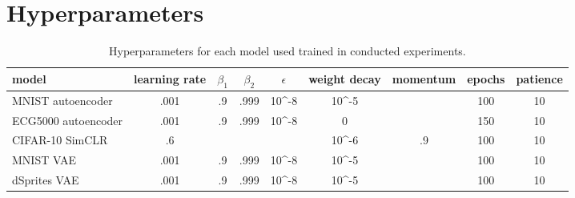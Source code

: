 \section{Hyperparameters}
\label{sec:apphyper}
\begin{table}[h]
	\vskip -0.1in
 	\caption{Hyperparameters for each model used trained in conducted experiments.}
	\vspace{-0.1in}
	\label{tab:hyperparams}
	\vskip 0.05in
	\begin{center}
		\begin{adjustbox}{width=\columnwidth}
			\begin{small}
				\begin{sc}
                    \begin{tabular}{l | cccccccc}
                    \toprule
                    model               & learning rate & $\beta_1$ & $\beta_2$ & $\epsilon$               & weight decay             & momentum & epochs & patience \\
                    \hline
                    MNIST autoencoder   & .001          & .9      & .999    & 10\textasciicircum-8 & 10\textasciicircum-5 &          & 100    & 10       \\
                    ECG5000 autoencoder & .001          & .9      & .999    & 10\textasciicircum-8 & 0                      &          & 150    & 10       \\
                    CIFAR-10 SimCLR     & .6            &         &         &                        & 10\textasciicircum-6 & .9       & 100    & 10\\
                    MNIST VAE           & .001          & .9      & .999    & 10\textasciicircum-8 & 10\textasciicircum-5 &          & 100    & 10       \\
                    dSprites VAE       & .001          & .9      & .999    & 10\textasciicircum-8 & 10\textasciicircum-5 &          & 100    & 10      \\
                    \bottomrule
                    \end{tabular}
				\end{sc}
			\end{small}	
		\end{adjustbox}
	\end{center}
\vspace{0in}
\end{table}


% 